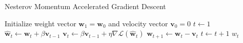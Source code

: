 \begin{algorithm}[h!]
	\caption{Nesterov Momentum Accelerated Gradient Descent}
	\label{alg:ngd}
	\begin{algorithmic}[1]
			\State Initialize weight vector $\textbf{w}_1 = \textbf{w}_0$ and velocity vector $\textbf{v}_0 = 0$
			\State $t \gets 1$
				\State $\hat{\textbf{w}}_t \gets \textbf{w}_t + \beta \textbf{v}_{t-1}$
				\State $\textbf{v}_t \gets \beta \textbf{v}_{t-1} + \eta \nabla \mathcal{L}(\hat{\textbf{w}}_t)$
				\State $\textbf{w}_{t+1} \gets \textbf{w}_t - \textbf{v}_t$
				\State $t \gets t + 1$
			\EndWhile
			\State \Return $w_t$
		\EndFunction
	\end{algorithmic}
\end{algorithm}